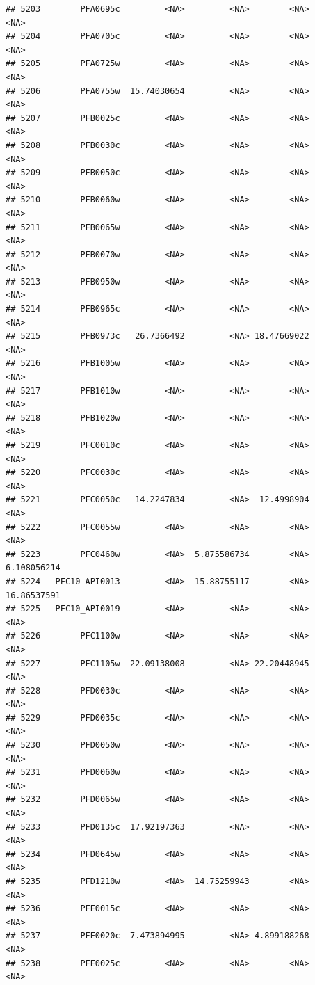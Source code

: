 \documentclass[12pt, a4paper]{article}\usepackage[]{graphicx}\usepackage[]{color}
\makeatletter
\newenvironment{kframe}{%
 \def\at@end@of@kframe{}%
 \ifinner\ifhmode%
  \def\at@end@of@kframe{\end{minipage}}%
  \begin{minipage}{\columnwidth}%
 \fi\fi%
 \def\FrameCommand##1{\hskip\@totalleftmargin \hskip-\fboxsep
 \colorbox{shadecolor}{##1}\hskip-\fboxsep
     \hskip-\linewidth \hskip-\@totalleftmargin \hskip\columnwidth}%
 \MakeFramed {\advance\hsize-\width
   \@totalleftmargin\z@ \linewidth\hsize
   \@setminipage}}%
 {\par\unskip\endMakeFramed%
 \at@end@of@kframe}
\newenvironment{knitrout}{}{} %
\makeatother
\begin{document}
\begin{knitrout}
\begin{kframe}
\begin{verbatim}
## 5203        PFA0695c         <NA>         <NA>        <NA>        <NA>
## 5204        PFA0705c         <NA>         <NA>        <NA>        <NA>
## 5205        PFA0725w         <NA>         <NA>        <NA>        <NA>
## 5206        PFA0755w  15.74030654         <NA>        <NA>        <NA>
## 5207        PFB0025c         <NA>         <NA>        <NA>        <NA>
## 5208        PFB0030c         <NA>         <NA>        <NA>        <NA>
## 5209        PFB0050c         <NA>         <NA>        <NA>        <NA>
## 5210        PFB0060w         <NA>         <NA>        <NA>        <NA>
## 5211        PFB0065w         <NA>         <NA>        <NA>        <NA>
## 5212        PFB0070w         <NA>         <NA>        <NA>        <NA>
## 5213        PFB0950w         <NA>         <NA>        <NA>        <NA>
## 5214        PFB0965c         <NA>         <NA>        <NA>        <NA>
## 5215        PFB0973c   26.7366492         <NA> 18.47669022        <NA>
## 5216        PFB1005w         <NA>         <NA>        <NA>        <NA>
## 5217        PFB1010w         <NA>         <NA>        <NA>        <NA>
## 5218        PFB1020w         <NA>         <NA>        <NA>        <NA>
## 5219        PFC0010c         <NA>         <NA>        <NA>        <NA>
## 5220        PFC0030c         <NA>         <NA>        <NA>        <NA>
## 5221        PFC0050c   14.2247834         <NA>  12.4998904        <NA>
## 5222        PFC0055w         <NA>         <NA>        <NA>        <NA>
## 5223        PFC0460w         <NA>  5.875586734        <NA> 6.108056214
## 5224   PFC10_API0013         <NA>  15.88755117        <NA> 16.86537591
## 5225   PFC10_API0019         <NA>         <NA>        <NA>        <NA>
## 5226        PFC1100w         <NA>         <NA>        <NA>        <NA>
## 5227        PFC1105w  22.09138008         <NA> 22.20448945        <NA>
## 5228        PFD0030c         <NA>         <NA>        <NA>        <NA>
## 5229        PFD0035c         <NA>         <NA>        <NA>        <NA>
## 5230        PFD0050w         <NA>         <NA>        <NA>        <NA>
## 5231        PFD0060w         <NA>         <NA>        <NA>        <NA>
## 5232        PFD0065w         <NA>         <NA>        <NA>        <NA>
## 5233        PFD0135c  17.92197363         <NA>        <NA>        <NA>
## 5234        PFD0645w         <NA>         <NA>        <NA>        <NA>
## 5235        PFD1210w         <NA>  14.75259943        <NA>        <NA>
## 5236        PFE0015c         <NA>         <NA>        <NA>        <NA>
## 5237        PFE0020c  7.473894995         <NA> 4.899188268        <NA>
## 5238        PFE0025c         <NA>         <NA>        <NA>        <NA>

\end{verbatim}
\end{kframe}
\end{knitrout}
\end{document}
